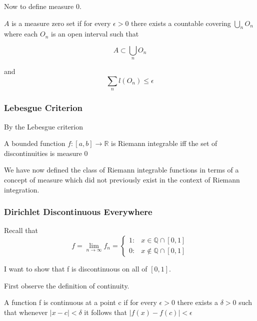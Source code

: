 \documentclass[12pt]{article}
\theoremstyle{plain}
\theoremstyle{definition}
\theoremstyle{definition}
\theoremstyle{remark}
\begin{document}
Now to define measure 0.

\begin{definition}[Measure 0]
    $A$ is a measure zero set if for every $\epsilon > 0$ there exists a countable covering $\bigcup_n O_n$ 
    where each $O_n$ is an open interval such that  

    \begin{equation}
        A \subset \bigcup_n O_n
    \end{equation}
    
    and
    \begin{equation}
        \sum_{n} l(O_n) \leq \epsilon
    \end{equation}
\end{definition}


\subsubsection{Lebesgue Criterion}

By the Lebesgue criterion
\begin{theorem}
    A bounded function $f\colon [a, b] \to \mathbb{R}$ is Riemann integrable iff the set of discontinuities 
    is measure 0
\end{theorem}

We have now defined the class of Riemann integrable functions in terms of a concept of measure
which did not previously exist in the context of Riemann integration.


\subsubsection{Dirichlet Discontinuous Everywhere}

Recall that
\begin{equation*}
    f = \lim_{n \to \infty} f_n = \begin{cases}
                        1: & x \in \mathbb{Q} \cap [0, 1] \\
                        0: & x \not\in \mathbb{Q} \cap [0, 1]
                        \end{cases}
\end{equation*}

I want to show that f is discontinuous on all of $[0, 1]$.

First observe the definition of continuity.

\begin{definition}
    A function f is continuous at a point c if for every $\epsilon > 0$
    there exists a $\delta > 0$ such that whenever $|x - c| < \delta$ it follows that
    $|f(x) - f(c)| < \epsilon$
\end{definition}
\end{document}
